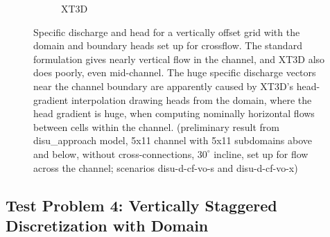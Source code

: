 \documentclass{article}
\begin{document}
\begin{figure}[H]
\begin{subfigure}{0.4\textwidth}
	\caption{XT3D}
	\label{fig:disu-x-nocc-cf-head}
\end{subfigure}
\caption{Specific discharge and head for a vertically offset grid with the domain and boundary heads set up for crossflow. The standard formulation gives nearly vertical flow in the channel, and XT3D also does poorly, even mid-channel. The huge specific discharge vectors near the channel boundary are apparently caused by XT3D's head-gradient interpolation drawing heads from the domain, where the head gradient is huge, when computing nominally horizontal flows between cells within the channel. (preliminary result from disu\_approach model, 5x11 channel with 5x11 subdomains above and below, without cross-connections, $30^{\circ}$ incline, set up for flow across the channel; scenarios disu-d-cf-vo-s and disu-d-cf-vo-x)}
\label{fig:figures}
\end{figure}

\subsection{Test Problem 4: Vertically Staggered Discretization with Domain}
\end{document}

